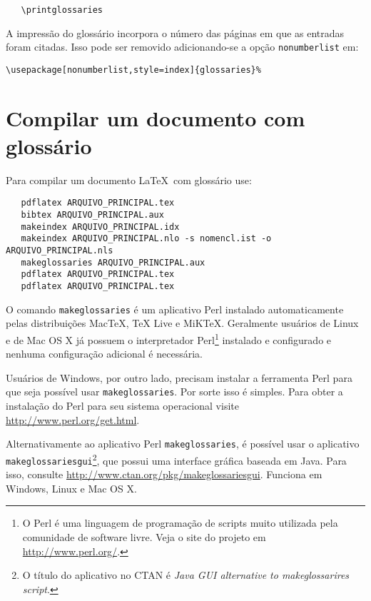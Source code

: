 \documentclass[12pt,openright,twoside,a4paper,brazil]{abntex2}
\begin{document}
\begin{verbatim}
   \printglossaries
\end{verbatim}

A impressão do glossário incorpora o número das páginas em que as entradas foram
citadas. Isso pode ser removido adicionando-se a opção \texttt{nonumberlist} em:

\begin{verbatim}
\usepackage[nonumberlist,style=index]{glossaries}%
\end{verbatim}

\section{Compilar um documento com glossário}
\label{sec-compilar-glossario}
 
Para compilar um documento \LaTeX\ com glossário use:

\begin{verbatim}
   pdflatex ARQUIVO_PRINCIPAL.tex
   bibtex ARQUIVO_PRINCIPAL.aux
   makeindex ARQUIVO_PRINCIPAL.idx 
   makeindex ARQUIVO_PRINCIPAL.nlo -s nomencl.ist -o ARQUIVO_PRINCIPAL.nls
   makeglossaries ARQUIVO_PRINCIPAL.aux
   pdflatex ARQUIVO_PRINCIPAL.tex
   pdflatex ARQUIVO_PRINCIPAL.tex
\end{verbatim}
 
O comando \texttt{makeglossaries} é um aplicativo Perl instalado
automaticamente pelas distribuições MacTeX, TeX Live e MiKTeX. Geralmente
usuários de Linux e de Mac OS X já possuem o interpretador Perl\footnote{O Perl
é uma linguagem de programação de scripts muito utilizada pela comunidade de
software livre. Veja o site do projeto em \url{http://www.perl.org/}.} instalado
e configurado e nenhuma configuração adicional é necessária.

Usuários de Windows, por outro lado, precisam instalar a ferramenta Perl para
que seja possível usar \texttt{makeglossaries}. Por sorte isso é simples. Para
obter a instalação do Perl para seu sistema operacional visite \url{http://www.perl.org/get.html}.

Alternativamente ao aplicativo Perl \texttt{makeglossaries}, é possível usar o
aplicativo \texttt{makeglossariesgui}\footnote{O título do aplicativo no CTAN
é \textit{Java GUI alternative to makeglossarires script}.}, que possui uma
interface gráfica baseada em Java. Para isso, consulte
\url{http://www.ctan.org/pkg/makeglossariesgui}. Funciona em Windows,
Linux e Mac OS X.

\end{document}
